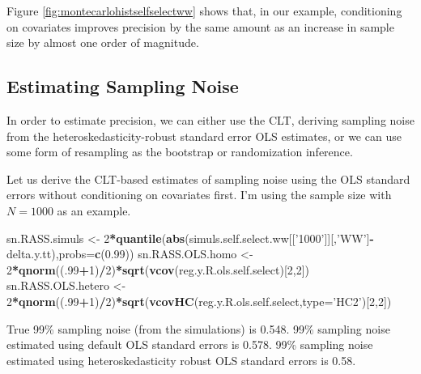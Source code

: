 \documentclass[]{book}
\newenvironment{Shaded}{\begin{snugshade}}{\end{snugshade}}
\newcommand{\DataTypeTok}[1]{\textcolor[rgb]{0.13,0.29,0.53}{#1}}
\newcommand{\DecValTok}[1]{\textcolor[rgb]{0.00,0.00,0.81}{#1}}
\newcommand{\FloatTok}[1]{\textcolor[rgb]{0.00,0.00,0.81}{#1}}
\newcommand{\KeywordTok}[1]{\textcolor[rgb]{0.13,0.29,0.53}{\textbf{#1}}}
\newcommand{\NormalTok}[1]{#1}
\newcommand{\OperatorTok}[1]{\textcolor[rgb]{0.81,0.36,0.00}{\textbf{#1}}}
\newcommand{\StringTok}[1]{\textcolor[rgb]{0.31,0.60,0.02}{#1}}
\theoremstyle{definition}
\theoremstyle{definition}
\theoremstyle{definition}
\theoremstyle{remark}
\let\BeginKnitrBlock\begin \let\EndKnitrBlock\end
\begin{document}
Figure \ref{fig:montecarlohistselfselectww} shows that, in our example, conditioning on covariates improves precision by the same amount as an increase in sample size by almost one order of magnitude.

\hypertarget{estimating-sampling-noise-1}{%
\subsection{Estimating Sampling Noise}\label{estimating-sampling-noise-1}}

In order to estimate precision, we can either use the CLT, deriving sampling noise from the heteroskedasticity-robust standard error OLS estimates, or we can use some form of resampling as the bootstrap or randomization inference.

\BeginKnitrBlock{example}
\protect\hypertarget{exm:unnamed-chunk-86}{}{\label{exm:unnamed-chunk-86} }Let us derive the CLT-based estimates of sampling noise using the OLS standard errors without conditioning on covariates first.
I'm using the sample size with \(N=1000\) as an example.
\EndKnitrBlock{example}

\begin{Shaded}
\begin{Highlighting}[]
\NormalTok{sn.RASS.simuls <-}\StringTok{ }\DecValTok{2}\OperatorTok{*}\KeywordTok{quantile}\NormalTok{(}\KeywordTok{abs}\NormalTok{(simuls.self.select.ww[[}\StringTok{'1000'}\NormalTok{]][,}\StringTok{'WW'}\NormalTok{]}\OperatorTok{-}\NormalTok{delta.y.tt),}\DataTypeTok{probs=}\KeywordTok{c}\NormalTok{(}\FloatTok{0.99}\NormalTok{))}
\NormalTok{sn.RASS.OLS.homo <-}\StringTok{ }\DecValTok{2}\OperatorTok{*}\KeywordTok{qnorm}\NormalTok{((.}\DecValTok{99}\OperatorTok{+}\DecValTok{1}\NormalTok{)}\OperatorTok{/}\DecValTok{2}\NormalTok{)}\OperatorTok{*}\KeywordTok{sqrt}\NormalTok{(}\KeywordTok{vcov}\NormalTok{(reg.y.R.ols.self.select)[}\DecValTok{2}\NormalTok{,}\DecValTok{2}\NormalTok{])}
\NormalTok{sn.RASS.OLS.hetero <-}\StringTok{ }\DecValTok{2}\OperatorTok{*}\KeywordTok{qnorm}\NormalTok{((.}\DecValTok{99}\OperatorTok{+}\DecValTok{1}\NormalTok{)}\OperatorTok{/}\DecValTok{2}\NormalTok{)}\OperatorTok{*}\KeywordTok{sqrt}\NormalTok{(}\KeywordTok{vcovHC}\NormalTok{(reg.y.R.ols.self.select,}\DataTypeTok{type=}\StringTok{'HC2'}\NormalTok{)[}\DecValTok{2}\NormalTok{,}\DecValTok{2}\NormalTok{])}
\end{Highlighting}
\end{Shaded}

True 99\% sampling noise (from the simulations) is 0.548.
99\% sampling noise estimated using default OLS standard errors is 0.578.
99\% sampling noise estimated using heteroskedasticity robust OLS standard errors is 0.58.
\end{document}
